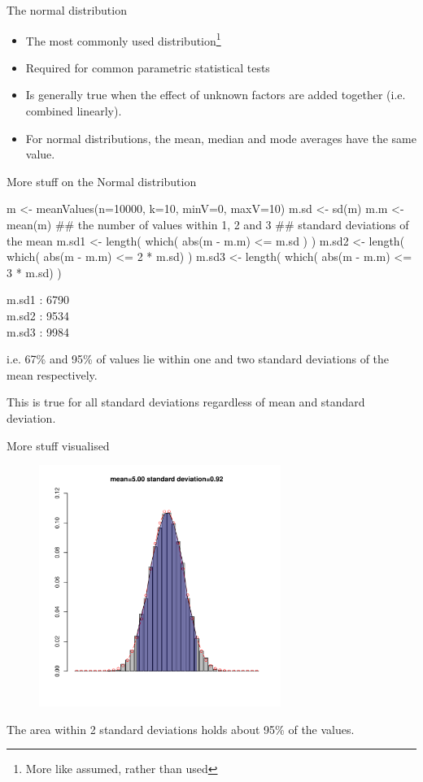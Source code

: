 \documentclass[pdf]{beamer}
\begin{document}
\begin{frame}{The normal distribution}
\begin{itemize}
\item The most commonly used distribution\footnote{More like assumed, rather than used}
\item Required for common parametric statistical tests
\item Is generally true when the effect of unknown factors are added together
  (i.e. combined linearly).
\item For normal distributions, the mean, median and mode averages have the
  same value.
\end{itemize}
\end{frame}

\begin{frame}[fragile]{More stuff on the Normal distribution}
  \begin{rcode}
    m <- meanValues(n=10000, k=10, minV=0, maxV=10)
    m.sd <- sd(m)
    m.m <- mean(m)
    ## the number of values within 1, 2 and 3 
    ## standard deviations of the mean
    m.sd1 <- length( which( abs(m - m.m) <= m.sd ) )
    m.sd2 <- length( which( abs(m - m.m) <= 2 * m.sd) )
    m.sd3 <- length( which( abs(m - m.m) <= 3 * m.sd) )
  \end{rcode}

  m.sd1 : 6790\\
  m.sd2 : 9534\\
  m.sd3 : 9984

  i.e. 67\% and 95\% of values lie within one and two standard deviations of
  the mean respectively.

  This is true for all standard deviations regardless of mean and standard
  deviation.
\end{frame}

\begin{frame}{More stuff visualised}
  \begin{figure}[ht]
    \includegraphics[width=0.7\textwidth]{images/dist4}
  \end{figure}
  \vspace{-8ex}
  The area within 2 standard deviations holds about 95\% of the values.
\end{frame}
\end{document}
